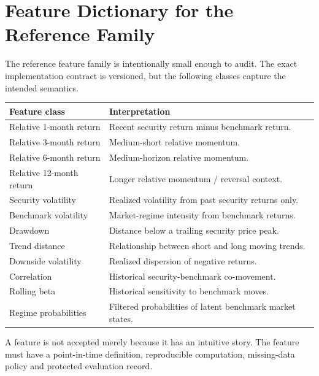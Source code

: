 \documentclass[11pt]{article}
\begin{document}
\section{Feature Dictionary for the Reference Family}
The reference feature family is intentionally small enough to audit. The exact implementation contract is versioned, but the following classes capture the intended semantics.
\begin{longtable}{p{}p{}}
\toprule
Feature class & Interpretation\\
\midrule
\endhead
Relative 1-month return & Recent security return minus benchmark return.\\
Relative 3-month return & Medium-short relative momentum.\\
Relative 6-month return & Medium-horizon relative momentum.\\
Relative 12-month return & Longer relative momentum / reversal context.\\
Security volatility & Realized volatility from past security returns only.\\
Benchmark volatility & Market-regime intensity from benchmark returns.\\
Drawdown & Distance below a trailing security price peak.\\
Trend distance & Relationship between short and long moving trends.\\
Downside volatility & Realized dispersion of negative returns.\\
Correlation & Historical security-benchmark co-movement.\\
Rolling beta & Historical sensitivity to benchmark moves.\\
Regime probabilities & Filtered probabilities of latent benchmark market states.\\
\bottomrule
\end{longtable}

A feature is not accepted merely because it has an intuitive story. The feature must have a point-in-time definition, reproducible computation, missing-data policy and protected evaluation record.
\end{document}
